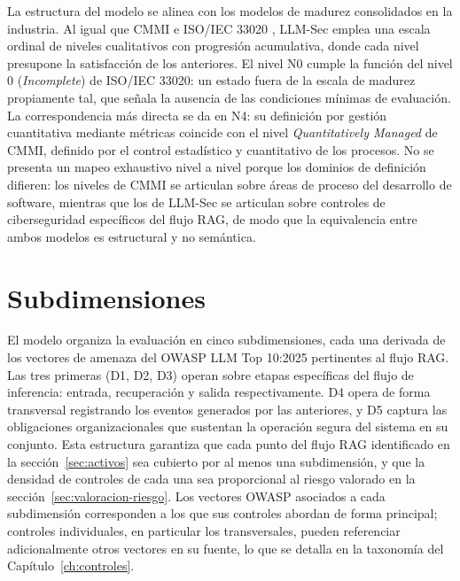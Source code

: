 La estructura del modelo se alinea con los modelos de madurez consolidados en la industria. Al igual que CMMI \cite{cmmi} e ISO/IEC 33020 \cite{iso33020}, LLM-Sec emplea una escala ordinal de niveles cualitativos con progresión acumulativa, donde cada nivel presupone la satisfacción de los anteriores. El nivel N0 cumple la función del nivel 0 (\textit{Incomplete}) de ISO/IEC 33020: un estado fuera de la escala de madurez propiamente tal, que señala la ausencia de las condiciones mínimas de evaluación. La correspondencia más directa se da en N4: su definición por gestión cuantitativa mediante métricas coincide con el nivel \textit{Quantitatively Managed} de CMMI, definido por el control estadístico y cuantitativo de los procesos. No se presenta un mapeo exhaustivo nivel a nivel porque los dominios de definición difieren: los niveles de CMMI se articulan sobre áreas de proceso del desarrollo de software, mientras que los de LLM-Sec se articulan sobre controles de ciberseguridad específicos del flujo RAG, de modo que la equivalencia entre ambos modelos es estructural y no semántica.

\section{Subdimensiones}
\label{sec:subdimensiones}

El modelo organiza la evaluación en cinco subdimensiones, cada una derivada de los vectores de amenaza del OWASP LLM Top 10:2025 \cite{owasp2025} pertinentes al flujo RAG. Las tres primeras (D1, D2, D3) operan sobre etapas específicas del flujo de inferencia: entrada, recuperación y salida respectivamente. D4 opera de forma transversal registrando los eventos generados por las anteriores, y D5 captura las obligaciones organizacionales que sustentan la operación segura del sistema en su conjunto. Esta estructura garantiza que cada punto del flujo RAG identificado en la sección~\ref{sec:activos} sea cubierto por al menos una subdimensión, y que la densidad de controles de cada una sea proporcional al riesgo valorado en la sección~\ref{sec:valoracion-riesgo}. Los vectores OWASP asociados a cada subdimensión corresponden a los que sus controles abordan de forma principal; controles individuales, en particular los transversales, pueden referenciar adicionalmente otros vectores en su fuente, lo que se detalla en la taxonomía del Capítulo~\ref{ch:controles}. 

